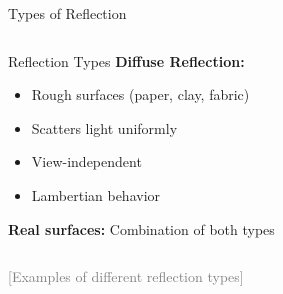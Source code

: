 \begin{frame}{Types of Reflection}
\begin{columns}
\begin{column}{0.5\textwidth}
\begin{raybox}{Reflection Types}
        \vspace{0.3cm}
        \textbf{Diffuse Reflection:}
        \begin{itemize}
            \footnotesize
          \item Rough surfaces (paper, clay, fabric)
          \item Scatters light uniformly
          \item View-independent
          \item Lambertian behavior
        \end{itemize}

        \vspace{0.3cm}
        \pause
        \textbf{Real surfaces:} Combination of both types
      \end{raybox}
    \end{column}
  \end{columns}

  \vspace{0.3cm}
  \textcolor{gray}{[Examples of different reflection types]}
\end{frame}

